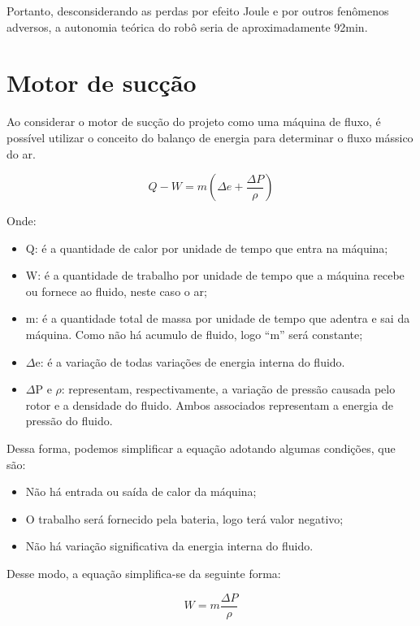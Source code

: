 Portanto, desconsiderando as perdas por efeito Joule e por outros fenômenos adversos, a autonomia teórica do robô seria de aproximadamente 92min.

\section{Motor de sucção}
Ao considerar o motor de sucção do projeto como uma máquina de fluxo, é possível utilizar o conceito do balanço de energia para determinar o fluxo mássico do ar.

\begin{equation}
Q-W = m\left(\Delta e+\frac{\Delta P}{\rho}\right)
\end{equation}

Onde:
\begin{itemize}
	\item{Q:} é a quantidade de calor por unidade de tempo que entra na máquina;
	\item{W:} é a quantidade de trabalho por unidade de tempo que a máquina recebe ou fornece ao fluido, neste caso o ar;
	\item{m:} é a quantidade total de massa por unidade de tempo que adentra e sai da máquina. Como não há acumulo de fluido, logo “m” será constante;
	\item{$\Delta$e:} é a variação de todas variações de energia interna do fluido.
	\item {$\Delta$P e \(\rho\):} representam, respectivamente, a variação de pressão causada pelo rotor e a densidade do fluido. Ambos associados representam a energia de pressão do fluido.
\end{itemize}

Dessa forma, podemos simplificar a equação adotando algumas condições, que são:

\begin{itemize}
	\item Não há entrada ou saída de calor da máquina; 
	\item O trabalho será fornecido pela bateria, logo terá valor negativo;
	\item Não há variação significativa da energia interna do fluido.
\end{itemize}

Desse modo, a equação simplifica-se da seguinte forma:

\begin{equation}
W = m\frac{\Delta P}{\rho}
\end{equation}

